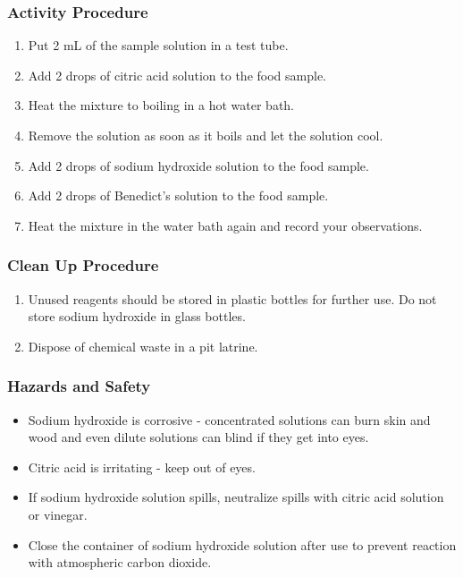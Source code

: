 \subsubsection*{Activity Procedure}
\begin{enumerate}
\item{Put 2 mL of the sample solution in a test tube.}
\item{Add 2 drops of citric acid solution to the food sample.}
\item{Heat the mixture to boiling in a hot water bath.}
\item{Remove the solution as soon as it boils and let the solution cool.}
\item{Add 2 drops of sodium hydroxide solution to the food sample.}
\item{Add 2 drops of Benedict's solution to the food sample.}
\item{Heat the mixture in the water bath again and record your observations.}
\end{enumerate}

\subsubsection*{Clean Up Procedure}
\begin{enumerate}
\item{Unused reagents should be stored in plastic bottles for further use. Do not store sodium hydroxide in glass bottles.}
\item{Dispose of chemical waste in a pit latrine.}
\end{enumerate}

\subsubsection*{Hazards and Safety}
\begin{itemize}
\item{Sodium hydroxide is corrosive - concentrated solutions can burn skin and wood and even dilute solutions can blind if they get into eyes.}
\item{Citric acid is irritating - keep out of eyes.}
\item{If sodium hydroxide solution spills, neutralize spills with citric acid solution or vinegar.}
\item{Close the container of sodium hydroxide solution after use to prevent reaction with atmospheric carbon dioxide.}
\end{itemize}


